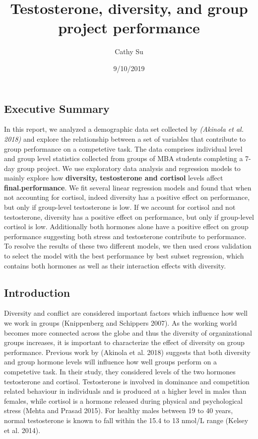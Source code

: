 \documentclass[]{article}
\title{Testosterone, diversity, and group project performance}
\author{Cathy Su}
\date{9/10/2019}
\begin{document}
\maketitle

\hypertarget{executive-summary}{%
\subsection{Executive Summary}\label{executive-summary}}

In this report, we analyzed a demographic data set collected by
\emph{(Akinola et al. 2018)} and explore the relationship between a set
of variables that contribute to group performance on a competetive task.
The data comprises individual level and group level statistics collected
from groups of MBA students completing a 7-day group project. We use
exploratory data analysis and regression models to mainly explore how
\textbf{diversity, testosterone and cortisol} levels affect
\textbf{final.performance}. We fit several linear regression models and
found that when not accounting for cortisol, indeed diversity has a
positive effect on performance, but only if group-level testosterone is
low. If we account for cortisol and not testosterone, diversity has a
positive effect on performance, but only if group-level cortisol is low.
Additionally both hormones alone have a positive effect on group
performance suggesting both stress and testosterone contribute to
performance. To resolve the results of these two different models, we
then used cross validation to select the model with the best performance
by best subset regression, which contains both hormones as well as their
interaction effects with diversity.

\hypertarget{introduction}{%
\subsection{Introduction}\label{introduction}}

Diversity and conflict are considered important factors which influence
how well we work in groups (Knippenberg and Schippers 2007). As the
working world becomes more connected across the globe and thus the
diversity of organizational groups increases, it is important to
characterize the effect of diversity on group performance. Previous work
by (Akinola et al. 2018) suggests that both diversity and group hormone
levels will influence how well groups perform on a competetive task. In
their study, they considered levels of the two hormones testosterone and
cortisol. Testosterone is involved in dominance and competition related
behaviour in individuals and is produced at a higher level in males than
females, while cortisol is a hormone released during physical and
psychological stress (Mehta and Prasad 2015). For healthy males between
19 to 40 years, normal testosterone is known to fall within the 15.4 to
13 nmol/L range (Kelsey et al. 2014).
\end{document}
